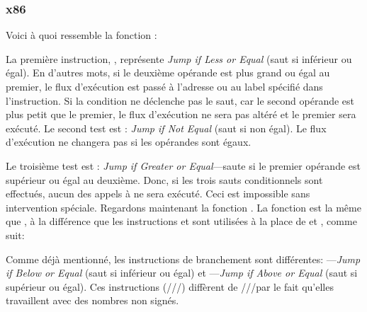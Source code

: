 \subsubsection{x86}


Voici à quoi ressemble la fonction  :




La première instruction, \JLE, représente \emph{Jump if Less or Equal} (saut si inférieur ou égal).
En d'autres mots, si le deuxième opérande est plus grand ou égal au premier,
le flux d'exécution est passé à l'adresse ou au label spécifié dans l'instruction.
Si la condition ne déclenche pas le saut, car le second opérande est plus petit que
le premier, le flux d'exécution ne sera pas altéré et le premier \printf sera
exécuté.
Le second test est \JNE: \emph{Jump if Not Equal} (saut si non égal).
Le flux d'exécution ne changera pas si les opérandes sont égaux.

Le troisième test est \JGE: \emph{Jump if Greater or Equal}---saute si le premier
opérande est supérieur ou égal au deuxième.
Donc, si les trois sauts conditionnels sont effectués, aucun des appels à \printf
ne sera exécuté.
Ceci est impossible sans intervention spéciale.
Regardons maintenant la fonction .
La fonction  est la même que , à la différence
que les instructions \JBE et \JAE sont utilisées à la place de \JLE et \JGE, comme
suit:




Comme déjà mentionné, les instructions de branchement sont différentes:
\JBE---\emph{Jump if Below or Equal} (saut si inférieur ou égal) et \JAE---\emph{Jump if Above or Equal}
(saut si supérieur ou égal).
Ces instructions (/\JAE/\JB/\JBE) diffèrent de \JG/\JGE/\JL/\JLE par le fait qu'elles
travaillent avec des nombres non signés.


